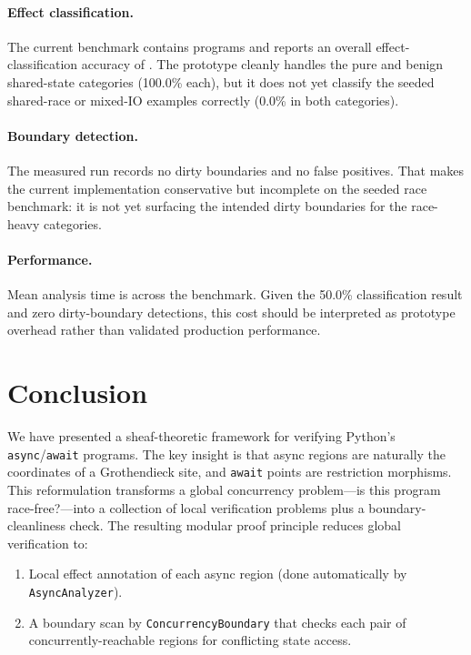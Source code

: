 \documentclass[11pt]{article}
\begin{document}
\paragraph{Effect classification.}
The current benchmark contains \ppTwentyfourTotalPrograms{} programs and
reports an overall effect-classification accuracy of
\expAccuracy{}.  The prototype cleanly handles the pure and benign
shared-state categories (100.0\% each), but it does not yet classify the
seeded shared-race or mixed-IO examples correctly (0.0\% in both
categories).

\paragraph{Boundary detection.}
The measured run records no dirty boundaries and no false positives.
That makes the current implementation conservative but incomplete on the
seeded race benchmark: it is not yet surfacing the intended dirty
boundaries for the race-heavy categories.

\paragraph{Performance.}
Mean analysis time is \expTimeMean{} across the benchmark.  Given the
50.0\% classification result and zero dirty-boundary detections, this
cost should be interpreted as prototype overhead rather than validated
production performance.

\section{Conclusion}\label{sec:conclusion}

We have presented a sheaf-theoretic framework for verifying Python's
\texttt{async}/\texttt{await} programs.  The key insight is that async
regions are naturally the coordinates of a Grothendieck site, and
\texttt{await} points are restriction morphisms.  This reformulation
transforms a global concurrency problem---is this program race-free?---into a
collection of local verification problems plus a boundary-cleanliness check.
The resulting modular proof principle reduces global verification to:
\begin{enumerate}
  \item Local effect annotation of each async region (done automatically by
        \texttt{AsyncAnalyzer}).
  \item A boundary scan by \texttt{ConcurrencyBoundary} that checks each
        pair of concurrently-reachable regions for conflicting state access.
\end{enumerate}
\end{document}
